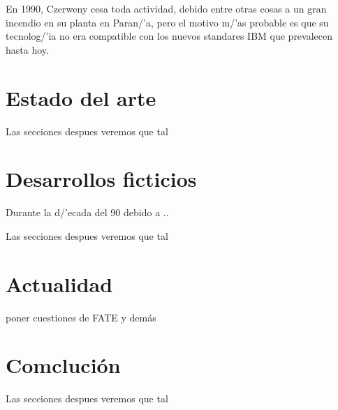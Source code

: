 \documentclass[%
 	final,
%
	notitlepage,
	narroweqnarray,
	inline,
 	twoside,
	]{ieee}
\begin{document}
En 1990, Czerweny cesa toda actividad, debido entre otras cosas a un gran incendio en su planta en Paran/'a, pero el motivo m/'as probable es que su tecnolog/'ia no era compatible con los nuevos standares IBM que prevalecen hasta hoy.

\section{Estado del arte}
Las secciones despues veremos que tal

\section{Desarrollos ficticios}
Durante la d/'ecada del 90 debido a ..


Las secciones despues veremos que tal

\section{Actualidad}
poner cuestiones de FATE y dem\'as


\section{Comcluci\'on}
Las secciones despues veremos que tal
\end{document}
